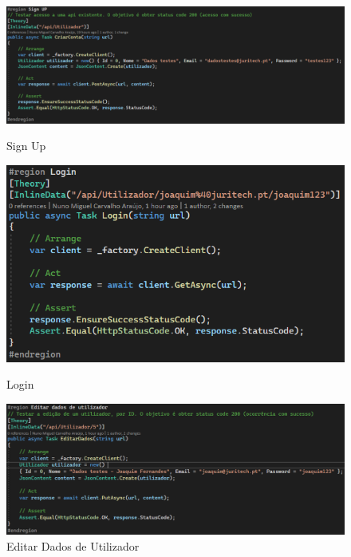 \begin{figure}[!htbp]
  \centering
  \begin{minipage}[b]{0.4\textwidth}
    \includegraphics[width=\textwidth]{Figuras/TestesUnitarios/Utilizador/Sign UP.png}
    \caption{Sign Up}
    \label{d.unitario}
  \end{minipage}
  \hfill
  \begin{minipage}[b]{0.4\textwidth}
    \includegraphics[width=\textwidth]{Figuras/TestesUnitarios/Utilizador/Login.png}
    \caption{Login}
    \label{d.unitario}
  \end{minipage}
  \centering
  \begin{minipage}[b]{0.4\textwidth}
    \includegraphics[width=\textwidth]{Figuras/TestesUnitarios/Utilizador/Editar dados de utilizador.png}
    \caption{Editar Dados de Utilizador}
    \label{d.unitario}
  \end{minipage}
\end{figure}

